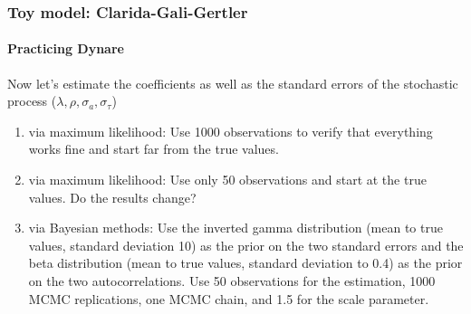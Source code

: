 \documentclass[handout]{beamer}  %
\newcounter{saveenumi}
\newcommand{\conti}{\setcounter{enumi}{\value{saveenumi}}}
\begin{document}
\begin{frame}\frametitle{Toy model: Clarida-Gali-Gertler}\framesubtitle{Practicing Dynare}
Now let's estimate the coefficients as well as the standard errors of the stochastic process ($\lambda,\rho,\sigma_a,\sigma_\tau$)
\begin{enumerate}\conti
  \item via maximum likelihood: Use 1000 observations to verify that everything works fine and start far from the true values.
  \item via maximum likelihood: Use only 50 observations and start at the true values. Do the results change?
  \item via Bayesian methods: Use the inverted gamma distribution (mean to true values, standard deviation 10) as the prior on the two standard errors and the beta distribution (mean to true values, standard deviation to 0.4) as the prior on the two autocorrelations. Use 50 observations for the estimation, 1000 MCMC replications, one MCMC chain, and 1.5 for the scale parameter.
\end{enumerate}
\end{frame}
\end{document}
